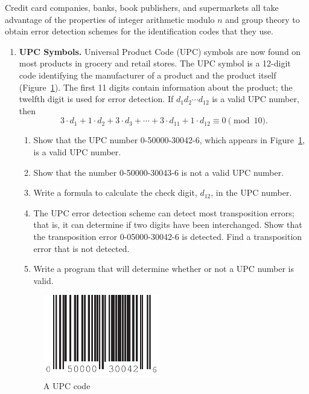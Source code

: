  
{\small
Credit card companies, banks, book publishers, and supermarkets all
take advantage of the properties of integer arithmetic modulo $n$ and
group theory to obtain error detection schemes for the identification
codes that they use. 
\begin{enumerate}
 


\item
{\bf UPC Symbols.}
Universal Product
Code (UPC) symbols are now found on most
products in grocery and retail stores. The UPC symbol is a 12-digit
code identifying the manufacturer of a product and the product itself
(Figure~\ref{groups_figure_3}). The first 11 digits contain information about the
product; the twelfth digit is used for error detection. If $d_1 d_2
\cdots d_{12}$ is a valid UPC number, then  
\[
3 \cdot d_1 + 1 \cdot d_2 + 3 \cdot d_3 + \cdots + 3 \cdot
d_{11} + 1 \cdot d_{12} \equiv 0 \pmod{10}.
\]
\begin{enumerate}
 
\item
Show that the UPC number  0-50000-30042-6, which appears in
Figure~\ref{groups_figure_3}, is a valid UPC number. 
 
\item
Show that the number 0-50000-30043-6 is not a valid UPC number.
 
\item
Write a  formula to calculate the check digit, $d_{12}$, in the UPC number. 
 
\item
The  UPC error detection scheme can detect most transposition errors; that is, it can determine if two digits have been interchanged.  Show that the transposition error 0-05000-30042-6 is detected.  Find a transposition error that is not detected. 
 
\item
Write a program that will determine whether or not a UPC number is valid. 
 
\end{enumerate}
 
\begin{figure}
\begin{center}
\centerline {
\includegraphics[width=2in]{UPCcode}
}
\end{center}
\caption{A UPC code}
\label{groups_figure_3}
\end{figure}


\end{enumerate}}
